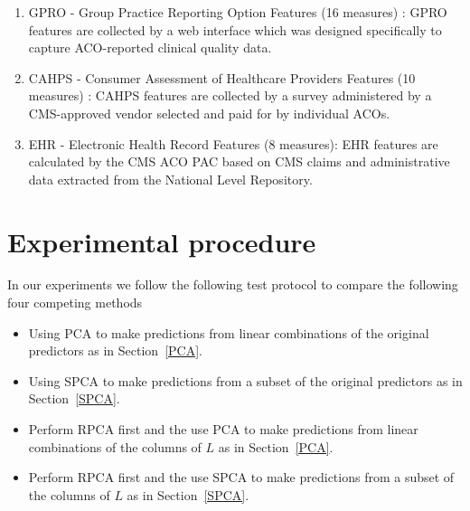 \documentclass[conference]{IEEEtran}
\begin{document}
\begin{enumerate}
\item GPRO - Group Practice Reporting Option Features (16 measures) : GPRO features are collected by a web interface which was designed specifically to capture ACO-reported clinical quality data.



\item CAHPS - Consumer Assessment of Healthcare Providers Features (10 measures) : CAHPS features
are collected by a survey administered by a CMS-approved vendor selected and paid for by individual ACOs.


\item EHR - Electronic Health Record Features (8 measures): EHR features
are calculated by the CMS ACO PAC based on CMS claims and administrative data extracted from the National Level Repository. 
\end{enumerate}




\section{Experimental procedure}
In our experiments we follow the following test protocol to compare the following four competing methods
\begin{itemize}
    \item Using PCA to make predictions from linear combinations of the original predictors as in Section~\ref{PCA}.
    \item Using SPCA to make predictions from a subset of the original predictors as in Section~\ref{SPCA}.
    \item Perform RPCA first and the use PCA to make predictions from linear combinations of the columns of $L$ as in Section~\ref{PCA}.
    \item Perform RPCA first and the use SPCA to make predictions from a subset of the columns of $L$ as in Section~\ref{SPCA}.
\end{itemize}
\end{document}
